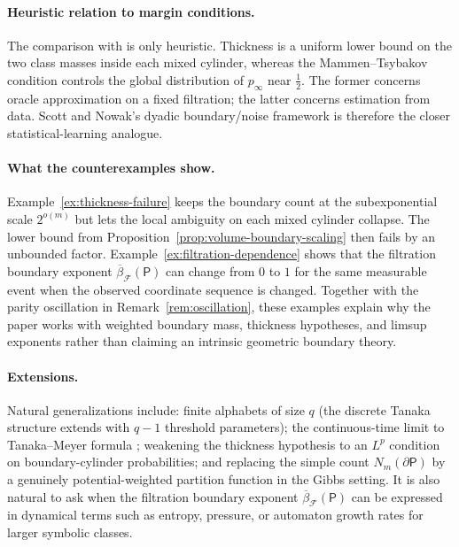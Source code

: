 \paragraph{Heuristic relation to margin conditions.}
The comparison with \cite{MammenTsybakov1999,Tsybakov2004} is only heuristic.
Thickness is a uniform lower bound on the two class masses inside each mixed
cylinder, whereas the Mammen--Tsybakov condition controls the global
distribution of $p_\infty$ near $\frac12$.  The former concerns oracle
approximation on a fixed filtration; the latter concerns estimation from data.
Scott and Nowak's dyadic boundary/noise framework
\cite{ScottNowak2006} is therefore the closer statistical-learning analogue.

\paragraph{What the counterexamples show.}
Example~\ref{ex:thickness-failure} keeps the boundary count at the
subexponential scale $2^{o(m)}$ but lets the local ambiguity on each mixed
cylinder collapse.  The lower bound from
Proposition~\ref{prop:volume-boundary-scaling} then fails by an unbounded factor.
Example~\ref{ex:filtration-dependence} shows that the filtration boundary
exponent $\overline{\beta}_{\mathcal{F}}(\mathsf{P})$ can change from $0$ to
$1$ for the same measurable event when the observed coordinate sequence is
changed.  Together with the parity oscillation in
Remark~\ref{rem:oscillation}, these examples explain why the paper works with
weighted boundary mass, thickness hypotheses, and limsup exponents rather than
claiming an intrinsic geometric boundary theory.

\paragraph{Extensions.}
Natural generalizations include: finite alphabets of size $q$ (the discrete
Tanaka structure extends with $q-1$ threshold parameters); the continuous-time
limit to Tanaka--Meyer formula \cite{RevuzYor1999}; weakening the thickness
hypothesis to an $L^p$ condition on boundary-cylinder probabilities; and
replacing the simple count $N_m(\partial\mathsf{P})$ by a genuinely
potential-weighted partition function in the Gibbs setting.  It is also
natural to ask when the filtration boundary exponent
$\overline{\beta}_{\mathcal{F}}(\mathsf{P})$ can be expressed in dynamical
terms such as entropy, pressure, or automaton growth rates for larger symbolic
classes.


